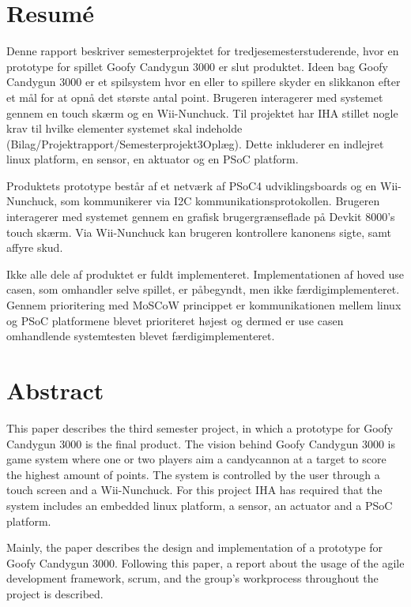 \chapter{Resumé}
Denne rapport beskriver semesterprojektet for tredjesemesterstuderende, hvor en prototype for spillet Goofy Candygun 3000 er slut produktet. Ideen bag Goofy Candygun 3000 er et spilsystem hvor en eller to spillere skyder en slikkanon efter et mål for at opnå det største antal point. Brugeren interagerer med systemet gennem en touch skærm og en Wii-Nunchuck. Til projektet har IHA stillet nogle krav til hvilke elementer systemet skal indeholde (Bilag/Projektrapport/Semesterprojekt3Oplæg). Dette inkluderer en indlejret linux platform, en sensor, en aktuator og en PSoC platform. \newline

\noindent Produktets prototype består af et netværk af PSoC4 udviklingsboards og en Wii-Nunchuck, som kommunikerer via I2C kommunikationsprotokollen. Brugeren interagerer med systemet gennem en grafisk brugergrænseflade på Devkit 8000's touch skærm. Via Wii-Nunchuck kan brugeren kontrollere kanonens sigte, samt affyre skud. \newline

\noindent Ikke alle dele af produktet er fuldt implementeret. Implementationen af hoved use casen, som omhandler selve spillet, er påbegyndt, men ikke færdigimplementeret. Gennem prioritering med MoSCoW princippet \cite{moscow} er kommunikationen mellem linux og PSoC platformene blevet prioriteret højest og dermed er use casen omhandlende systemtesten blevet færdigimplementeret.

\chapter{Abstract}
This paper describes the third semester project, in which a prototype for Goofy Candygun 3000 is the final product. The vision behind Goofy Candygun 3000 is game system where one or two players aim a candycannon at a target to score the highest amount of points. The system is controlled by the user through a touch screen and a Wii-Nunchuck. For this project IHA has required that the system includes an embedded linux platform, a sensor, an actuator and a PSoC platform. \newline

\noindent Mainly, the paper describes the design and implementation of a prototype for Goofy Candygun 3000. Following this paper, a report about the usage of the agile development framework, scrum, and the group's workprocess throughout the project is described. \newline 

